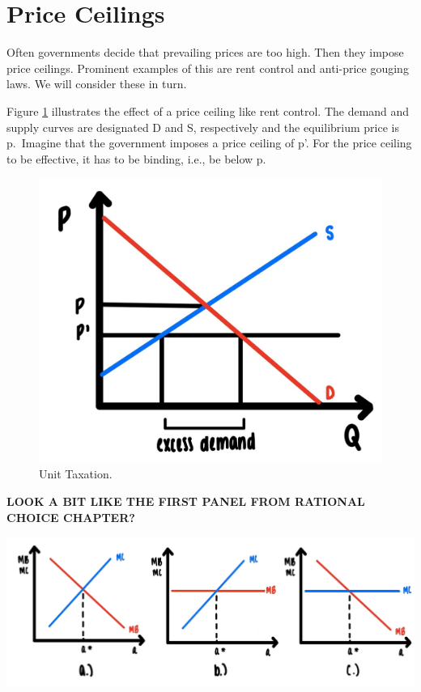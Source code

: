 \documentclass[
]{book}
\begin{document}
\hypertarget{price-ceilings}{%
\section{Price Ceilings}\label{price-ceilings}}

Often governments decide that prevailing prices are too high. Then they impose price ceilings. Prominent examples of this are rent control and anti-price gouging laws. We will consider these in turn.

Figure \ref{fig:compmarkets04} illustrates the effect of a price ceiling like rent control. The demand and supply curves are designated D and S, respectively and the equilibrium price is p.~Imagine that the government imposes a price ceiling of p'. For the price ceiling to be effective, it has to be binding, i.e., be below p.

\begin{figure}

{\centering \includegraphics[width=0.5\linewidth]{img/compmarkets/fig4} 

}

\caption{Unit Taxation.}\label{fig:compmarkets04}
\end{figure}

\begin{iucolor2}

\begin{center}
\textbf{LOOK A BIT LIKE THE FIRST PANEL FROM RATIONAL CHOICE CHAPTER?}

\end{center}

\begin{center}\includegraphics[width=1\linewidth]{img/rationalchoice/panels} \end{center}

\end{iucolor2}
\end{document}
